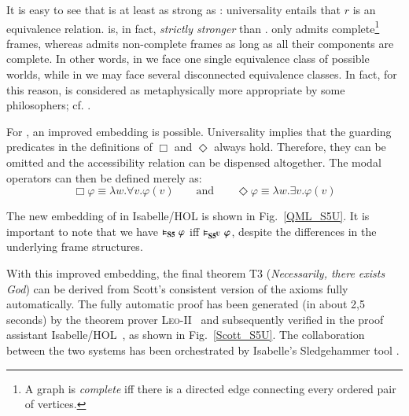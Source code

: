 \documentclass{article}
\newcommand{\Dia}{\Diamond} %
\newcommand{\BlackBox}{\blacksquare}
\newcommand{\BlackDia}{\Diamondblack}
\begin{document}
It is easy to see that \SFiveU is at least as strong as \SFive:
universality entails that $r$ is an equivalence relation. \SFiveU is,
in fact, \emph{strictly stronger} than \SFive. \SFiveU only admits
complete\footnote{A graph is \emph{complete} iff there is a directed
  edge connecting every ordered pair of vertices.} frames, whereas
\SFive admits non-complete frames as long as all their components are
complete. In other words, in \SFiveU we face one single equivalence
class of possible worlds, while in \SFive we may face several
disconnected equivalence classes. In fact, for this reason, \SFiveU is
considered as metaphysically more appropriate by some philosophers;
cf. \cite[p.~127]{williamson13}.

For \SFiveU, an improved embedding is possible. Universality implies
that the guarding predicates in the definitions of $\Box$ and
$\Diamond$ always hold. Therefore, they can be omitted and the
accessibility relation can be dispensed altogether. The modal
operators can then be defined merely as:
\[\Box \varphi \equiv \lambda w. \forall v.  \varphi(v) \qquad \text{and}
\qquad \Dia \varphi \equiv \lambda w.\exists v. \varphi(v)\]


The new embedding of \SFiveU in Isabelle/HOL is shown in
Fig.~\ref{QML_S5U}. It is important to note that we 
have  $\vDash_{\textbf{S5}} \varphi$ iff $\vDash_{\textbf{S5\textsuperscript{U}}} \varphi$,
despite the differences in the underlying frame structures.


%
%
With this improved embedding, the final theorem T3
(\textit{Necessarily, there exists God}) can be derived from
Scott's consistent version of the axioms fully automatically.  The fully
automatic proof has been generated (in about 2,5 seconds) by the theorem prover
\textsc{Leo-II}~\cite{C26} and subsequently verified in the proof
assistant Isabelle/HOL~\cite{NPW02}, as shown in Fig.~\ref{Scott_S5U}.
The collaboration between the two systems has been orchestrated by
Isabelle's Sledgehammer tool \cite{Sledgehammer}.
\end{document}
